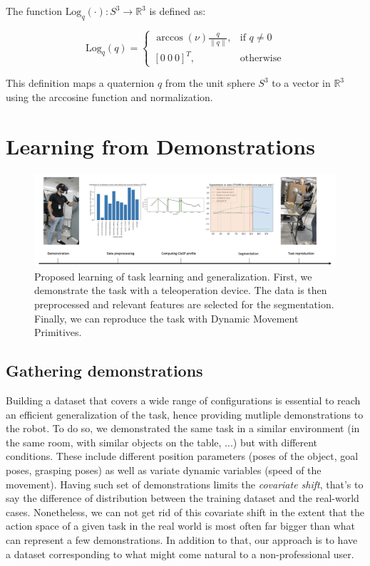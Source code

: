 \documentclass[conference]{IEEEtran}
\begin{document}
The function \(\text{Log}_q(\cdot) : S^3 \rightarrow \mathbb{R}^3\) is defined as:

\[
\text{Log}_q(q) = \begin{cases}
\arccos(\nu) \frac{q}{\|q\|}, & \text{if } q \neq 0 \\
[0 \ 0 \ 0]^T, & \text{otherwise}
\end{cases}
\]

This definition maps a quaternion \(q\) from the unit sphere \(S^3\) to a vector in \(\mathbb{R}^3\) using the arccosine function and normalization. 

\section{Learning from Demonstrations} \label{LfD}

\begin{figure}[t]
  \centering
       \includegraphics[width=\linewidth]{img/framework.png}
       \caption{Proposed learning of task learning and generalization. First, we demonstrate the task with a teleoperation device. The data is then preprocessed and relevant features are selected for the segmentation. Finally, we can reproduce the task with Dynamic Movement Primitives.}
     \label{fig:framework}
\end{figure}

\subsection{Gathering demonstrations}


Building a dataset that covers a wide range of configurations is essential to reach an efficient generalization of the task, hence providing mutliple demonstrations to the robot. To do so, we demonstrated the same task in a similar environment (in the same room, with similar objects on the table, ...) but with different conditions. These include different position parameters (poses of the object, goal poses, grasping poses) as well as variate dynamic variables (speed of the movement). Having such set of demonstrations limits the \textit{covariate  shift}, that's to say the difference of distribution between the training dataset and the real-world cases. Nonetheless, we can not get rid of  this covariate shift in the extent that the action space of a given task in the real world is most often far bigger than what can represent a few demonstrations. In addition to that, our approach is to have a dataset corresponding to what might come natural to a non-professional user.
\end{document}

